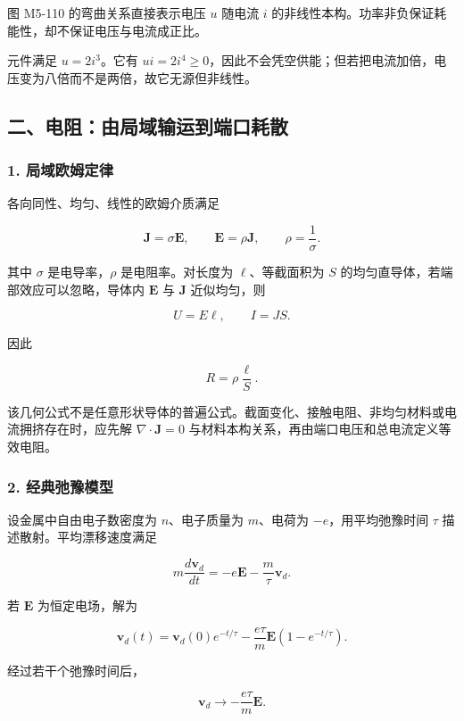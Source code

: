 图 M5-110 的弯曲关系直接表示电压 \(u\) 随电流 \(i\)
的非线性本构。功率非负保证耗能性，却不保证电压与电流成正比。

元件满足 \(u=2i^3\)。它有
\(ui=2i^4\ge0\)，因此不会凭空供能；但若把电流加倍，电压变为八倍而不是两倍，故它无源但非线性。

\subsection{二、电阻：由局域输运到端口耗散}\label{m5:ux4e8cux7535ux963bux7531ux5c40ux57dfux8f93ux8fd0ux5230ux7aefux53e3ux8017ux6563}

\subsubsection{1.
局域欧姆定律}\label{m5:ux5c40ux57dfux6b27ux59c6ux5b9aux5f8b}

各向同性、均匀、线性的欧姆介质满足

\[
\boxed{\mathbf J=\sigma\mathbf E},
\qquad
\boxed{\mathbf E=\rho\mathbf J},
\qquad
\rho=\frac1\sigma.
\]

其中 \(\sigma\) 是电导率，\(\rho\) 是电阻率。对长度为
\(\ell\)、等截面积为 \(S\) 的均匀直导体，若端部效应可以忽略，导体内
\(\mathbf E\) 与 \(\mathbf J\) 近似均匀，则

\[
U=E\ell,
\qquad
I=JS.
\]

因此

\[
\boxed{R=\rho\frac{\ell}{S}}.
\]

该几何公式不是任意形状导体的普遍公式。截面变化、接触电阻、非均匀材料或电流拥挤存在时，应先解
\(\nabla\cdot\mathbf J=0\)
与材料本构关系，再由端口电压和总电流定义等效电阻。

\subsubsection{2.
经典弛豫模型}\label{m5:ux7ecfux5178ux5f1bux8c6bux6a21ux578b}

设金属中自由电子数密度为 \(n\)、电子质量为 \(m\)、电荷为
\(-e\)，用平均弛豫时间 \(\tau\) 描述散射。平均漂移速度满足

\[
m\frac{d\mathbf v_d}{dt}
=-e\mathbf E-\frac m\tau\mathbf v_d.
\]

若 \(\mathbf E\) 为恒定电场，解为

\[
\mathbf v_d(t)
=\mathbf v_d(0)e^{-t/\tau}
-\frac{e\tau}{m}\mathbf E\left(1-e^{-t/\tau}\right).
\]

经过若干个弛豫时间后，

\[
\mathbf v_d\longrightarrow-\frac{e\tau}{m}\mathbf E.
\]


